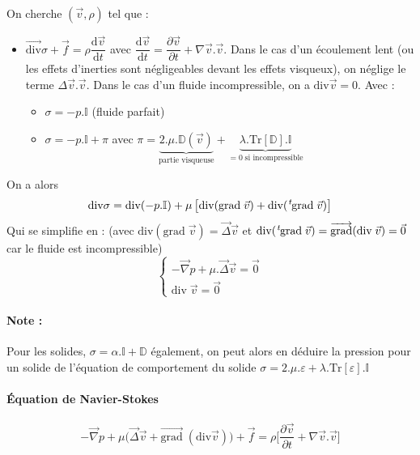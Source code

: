 \documentclass{article}
\newcommand{\deriv}{\mathrm{d}}
\newcommand{\grad}{\text{grad}\;}
\newcommand{\transpose}{\hspace{.1em}{}^t\hspace{-.1em}}
\begin{document}
On cherche $(\vec{v}, \rho)$ tel que :
\begin{itemize}[label=\textbullet]
\item $\overrightarrow{\text{div}} \sigma + \vec{f} = \rho \dfrac{\deriv \vec{v}}{\deriv t}$ avec $\dfrac{\deriv \vec{v}}{\deriv t} = \dfrac{\partial \vec{v}}{\partial t} + \nabla \vec{v}.\vec{v}$. Dans le cas d'un écoulement lent (ou les effets d'inerties sont négligeables devant les effets visqueux), on néglige le terme $\Delta \vec{v}.\vec{v}$. Dans le cas d'un fluide incompressible, on a $\text{div} \vec{v} = 0$.
Avec :
\begin{itemize}[label=$\star$]
\item $\sigma = -p.\mathbb{I}$ (fluide parfait)
\item $\sigma = -p.\mathbb{I} + \pi$ avec $\pi = \underbrace{2.\mu. \mathbb{D}(\vec{v})}_{\text{partie visqueuse}} + \underbrace{\lambda . \text{Tr}[\mathbb{D}].\mathbb{I}}_{=0 \; \text{si incompressible}}$
\end{itemize}
\end{itemize}

On a alors
\[\text{div}\sigma = \text{div}(-p.\mathbb{I})+\mu\left[\text{div}(\grad \vec{v}) + \text{div}(\transpose\grad \vec{v})\right]\]
Qui se simplifie en : (avec $\text{div}(\grad \vec{v}) = \vec{\Delta}\vec{v}$ et $\text{div}(\transpose\grad\vec{v})=\overrightarrow{\text{grad}}(\text{div}\;\vec{v})=\vec{0}$ car le fluide est incompressible)
\[\begin{cases}
-\vec{\nabla}p+\mu.\vec{\Delta}\vec{v}=\vec{0}\\
\text{div}\;\vec{v} = \vec{0}
\end{cases}\]

\paragraph{Note :} Pour les solides, $\sigma = \alpha. \mathbb{I} + \mathbb{D}$ également, on peut alors en déduire la pression pour un solide de l'équation de comportement du solide $\sigma = 2.\mu.\varepsilon + \lambda.\text{Tr}[\varepsilon].\mathbb{I}$


\paragraph{Équation de Navier-Stokes}
\[-\vec{\nabla}p + \mu \Big(\vec{\Delta}\vec{v} + \overrightarrow{\text{grad}}\; (\text{div} \vec{v})\Big) + \vec{f} = \rho \Big[\dfrac{\partial \vec{v}}{\partial t} + \nabla \vec{v}.\vec{v}\Big] \]
\end{document}
